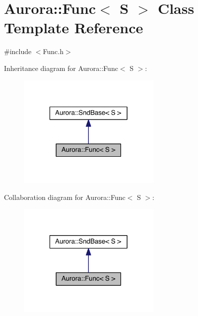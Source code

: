 \hypertarget{class_aurora_1_1_func}{}\section{Aurora\+:\+:Func$<$ S $>$ Class Template Reference}
\label{class_aurora_1_1_func}


{\ttfamily \#include $<$Func.\+h$>$}



Inheritance diagram for Aurora\+:\+:Func$<$ S $>$\+:\nopagebreak
\begin{figure}[H]
\begin{center}
\leavevmode
\includegraphics[width=196pt]{class_aurora_1_1_func__inherit__graph}
\end{center}
\end{figure}


Collaboration diagram for Aurora\+:\+:Func$<$ S $>$\+:\nopagebreak
\begin{figure}[H]
\begin{center}
\leavevmode
\includegraphics[width=196pt]{class_aurora_1_1_func__coll__graph}
\end{center}
\end{figure}

